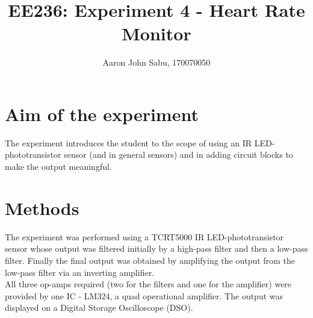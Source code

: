 \documentclass[12pt]{article}
\title{EE236: Experiment 4 -
Heart Rate Monitor}
\author{Aaron John Sabu, 170070050}
\begin{document}
\maketitle
\begin{multicols}{2}

\section{Aim of the experiment}

The experiment introduces the student to the scope of using an IR LED-phototransistor sensor (and in general sensors) and in adding circuit blocks to make the output meaningful.

\section{Methods}

The experiment was performed using a TCRT5000 IR LED-phototransistor sensor whose output was filtered initially by a high-pass filter and then a low-pass filter. Finally the final output was obtained by amplifying the output from the low-pass filter via an inverting amplifier.\\
All three op-amps required (two for the filters and one for the amplifier) were provided by one IC - LM324, a quad operational amplifier. The output was displayed on a Digital Storage Oscilloscope (DSO).\\


\end{multicols}
\end{document}
